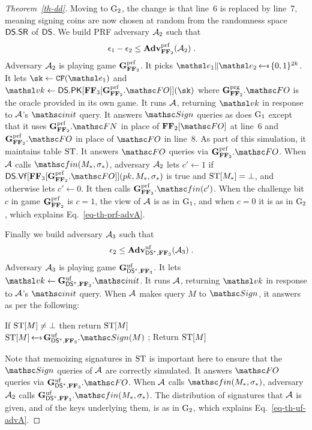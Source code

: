\begin{proof}[Theorem~\ref{th-dd}]
Moving to $\textnormal{G}_2$, the change is that line~6 is replaced by line~7, meaning signing coins are now chosen at random from the randomness space $\mathsf{DS}.\mathsf{SR}$ of $\mathsf{DS}$. We build  PRF adversary $\mathcal{A}_2$ such that 
\begin{align}
	\epsilon_1-\epsilon_2 &\leq  \mathbf{Adv}^{\mathrm{prf}}_{\mathbf{FF}_2}(\mathcal{A}_2)\;.\label{eq-th-prf-advA}
\end{align}
Adversary $\mathcal{A}_2$ is playing game $\mathbf{G}^{\mathrm{prf}}_{\mathbf{FF}_2}$. It picks $\eEDSA_1\|\eEDSA_2\getsr\bits^{2k}$. It lets $\sk\gets\CFEDSA(\eEDSA_1)$ and $\vk\gets\DS.\MakePK[\fF_3[\gamePRF_{\fF_2}.\HASH]](\sk)$ where $\gamePRG_{\fF_2}.\HASH$ is the oracle provided in its own game. It runs $\mathcal{A}$, returning $\vk$ in response to $\mathcal{A}$'s $\Initialize$ query. It answers $\SignO$ queries as does $\textnormal{G}_1$ except that it uses $\gamePRF_{\fF_2}.\FUNCO$ in place of $\fF_2[\HASH]$ at line~6 and $\gamePRF_{\fF_2}.\HASH$ in place of $\HASH$ in line~$8$. As part of this simulation, it maintains table $\mathrm{ST}$. It answers $\HASH$ queries via $\gamePRF_{\fF_2}.\HASH$. When $\mathcal{A}$ calls $\Finalize(\chmsg, \chsig)$, adversary $\mathcal{A}_2$ lets $c'\gets 1$ if $\DS.\Vf[\fF_3[\gamePRF_{\fF_2}.\HASH]](\pk, \chmsg, \chsig)$ is true and $\mathrm{ST}[{M}_*]=\bot$, and otherwise lets $c'\gets 0$. It then calls $\gamePRF_{\fF_2}.\Finalize(c')$. When the challenge bit $c$ in game $\mathbf{G}^{\mathrm{prf}}_{\mathbf{FF}_2}$ is $c=1$, the view of $\mathcal{A}$ is as in $\textnormal{G}_1$, and when $c=0$ it is as in $\textnormal{G}_2$, which explains Eq.~\eqref{eq-th-prf-advA}.

Finally we build adversary $\mathcal{A}_3$ such that 
\begin{align}
	\epsilon_2
	&\leq   \mathbf{Adv}^{\mathrm{uf}}_{\mathsf{DS}^*,\mathbf{FF}_3}(\mathcal{A}_3) \;. \label{eq-th-uf-advA}
\end{align}
Adversary $\mathcal{A}_3$ is playing game $\mathbf{G}^{\mathrm{uf}}_{\mathsf{DS}^*,\mathbf{FF}_3}$. It lets $\vk \gets \UFCMA_{\jDS,\fF_3}.\Initialize$. It runs $\mathcal{A}$, returning $\vk$ in response to $\mathcal{A}$'s $\Initialize$ query. When $\mathcal{A}$ makes query $M$ to $\SignO$, it answers as per the following:

\begin{tabbing}
If $\mathrm{ST}[{M}]\neq\bot$ then return $\mathrm{ST}[{M}]$ \\
$\STable[\msg] \getsr \UFCMA_{\jDS,\fF_3}.\SignO(M)$ ; Return $\mathrm{ST}[{M}]$ 
\end{tabbing} 

\noindent Note that memoizing signatures in $\mathrm{ST}$ is important here to ensure that the $\SignO$ queries of $\mathcal{A}$ are correctly simulated. It answers $\HASH$ queries via $\UFCMA_{\jDS,\fF_3}.\HASH$. When $\mathcal{A}$ calls $\Finalize(\chmsg, \chsig)$, adversary $\mathcal{A}_2$ calls $\UFCMA_{\jDS,\fF_3}.\Finalize(\chmsg, \chsig)$. The distribution of signatures that $\mathcal{A}$ is given, and of the keys underlying them, is as in $\textnormal{G}_2$, which explains Eq.~\eqref{eq-th-uf-advA}.


\end{proof}
